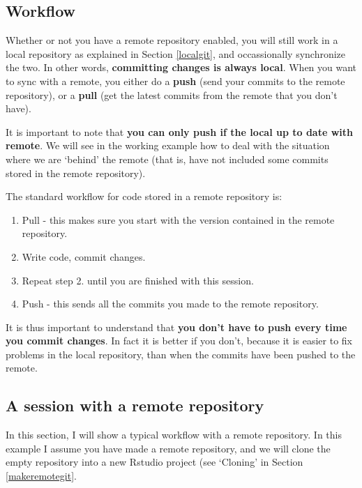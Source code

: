 \documentclass[]{book}
\providecommand{\tightlist}{%
  \setlength{\itemsep}{0pt}\setlength{\parskip}{0pt}}
\begin{document}
\hypertarget{gitremoteworkflow}{%
\subsection{Workflow}\label{gitremoteworkflow}}

Whether or not you have a remote repository enabled, you will still work in a local repository as explained in Section \ref{localgit}, and occassionally synchronize the two. In other words, \textbf{committing changes is always local}. When you want to sync with a remote, you either do a \textbf{push} (send your commits to the remote repository), or a \textbf{pull} (get the latest commits from the remote that you don't have).

It is important to note that \textbf{you can only push if the local up to date with remote}. We will see in the working example how to deal with the situation where we are `behind' the remote (that is, have not included some commits stored in the remote repository).

The standard workflow for code stored in a remote repository is:

\begin{enumerate}
\def\labelenumi{\arabic{enumi}.}
\tightlist
\item
  Pull - this makes sure you start with the version contained in the remote repository.
\item
  Write code, commit changes.
\item
  Repeat step 2. until you are finished with this session.
\item
  Push - this sends all the commits you made to the remote repository.
\end{enumerate}

It is thus important to understand that \textbf{you don't have to push every time you commit changes}. In fact it is better if you don't, because it is easier to fix problems in the local repository, than when the commits have been pushed to the remote.

\hypertarget{a-session-with-a-remote-repository}{%
\subsection{A session with a remote repository}\label{a-session-with-a-remote-repository}}

In this section, I will show a typical workflow with a remote repository. In this example I assume you have made a remote repository, and we will clone the empty repository into a new Rstudio project (see `Cloning' in Section \ref{makeremotegit}.
\end{document}
